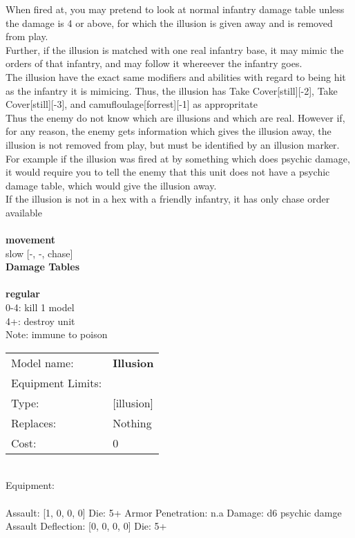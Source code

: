 \noindent When fired at, you may pretend to look at normal infantry damage table unless the damage is 4 or above, for which the illusion is given away and is removed from play.\\ 
Further, if the illusion is matched with one real infantry base, it may mimic the orders of that infantry, and may follow it whereever the infantry goes.\\ 
The illusion have the exact same modifiers and abilities with regard to being hit as the infantry it is mimicing. Thus, the illusion has Take Cover[still][-2], Take Cover[still][-3], and camufloulage[forrest][-1] as appropritate \\ 
 Thus the enemy do not know which are illusions and which are real. However if, for any reason, the enemy gets information which gives the illusion away, the illusion is not removed from play, but must be identified by an illusion marker. For example if the illusion was fired at by something which does psychic damage, it would require you to tell the enemy that this unit does not have a psychic damage table, which would give the illusion away.\\ 
If the illusion is not in a hex with a friendly infantry, it has only chase order available\\ 


\ \\ {\bf movement } \\
slow [-, -, chase] \\


{\bf Damage Tables} \\
\ \\ {\bf regular } \\
0-4: kill 1 model \\
4+: destroy unit \\
Note: immune to poison \\


\noindent
\begin{tabular}{ll}
Model name: &{\bf Illusion } \\
Equipment Limits: & \\
Type: &[illusion] \\
Replaces: &Nothing \\
Cost: & 0\\
\end{tabular}
\ \\
Equipment:  \\
\ \\
Assault: [1, 0, 0, 0] Die: 5+ Armor Penetration: n.a Damage: d6 psychic damge \\
Assault Deflection: [0, 0, 0, 0] Die: 5+\\
\indent  
\ \\

